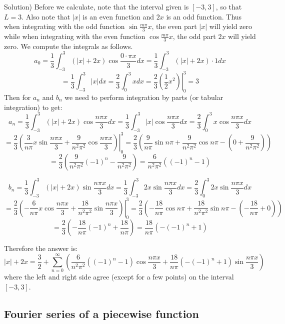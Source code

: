 \documentclass[12pt]{report}
\begin{document}
Solution)
Before we calculate, note that the interval given is $[-3,3]$, so that $L=3$. Also note that $|x|$ is an even function and $2x$ is an odd function. Thus when integrating with the odd function $\sin \frac{m\pi}{3} x$, the even part $|x|$ will yield zero while when integrating with the even function $\cos \frac{m\pi}{3} x$, the odd part $2x$ will yield zero. We compute the integrals as follows.
$$a_0 = \frac{1}{3} \int_{-3}^{3} (|x| +2x) \cos \frac{0\cdot \pi x }{3} dx = \frac{1}{3} \int_{-3}^{3} (|x| +2x) \cdot 1 dx $$
$$= \frac{1}{3} \int_{-3}^{3} |x| dx = \frac{2}{3} \int_{0}^{3} x dx = \frac{2}{3} \left. \left( \frac{1}{2} x^2 \right) \right\vert_0^3 = 3 $$
Then for $a_n$ and $b_n$ we need to perform integration by parts (or tabular integration) to get:
$$a_n = \frac{1}{3} \int_{-3}^{3} (|x| +2x) \cos \frac{n\pi x }{3} dx = \frac{1}{3} \int_{-3}^{3} |x| \cos \frac{n \pi x }{3} dx = \frac{2}{3} \int_{0}^{3} x \cos \frac{n\pi x }{3} dx$$
$$= \frac{2}{3} \left. \left( \frac{3}{n\pi} x \sin \frac{n\pi x }{3} + \frac{9}{n^2\pi^2} \cos \frac{n\pi x }{3} \right) \right\vert_0^3 = \frac{2}{3} \left(  \frac{9}{n\pi} \sin n\pi + \frac{9}{n^2\pi^2} \cos n\pi - \left(0 + \frac{9}{n^2\pi^2} \right) \right) $$
$$ = \frac{2}{3} \left( \frac{9}{n^2\pi^2} (-1)^n - \frac{9}{n^2\pi^2} \right) =\frac{6}{n^2\pi^2} \left((-1)^n-1\right) $$

$$b_n = \frac{1}{3} \int_{-3}^{3} (|x| +2x) \sin \frac{n\pi x }{3} dx = \frac{1}{3} \int_{-3}^{3} 2 x \sin \frac{n \pi x }{3} dx = \frac{2}{3} \int_{0}^{3} 2x \sin \frac{n\pi x }{3} dx$$
$$= \frac{2}{3} \left. \left( - \frac{6}{n\pi} x \cos \frac{n\pi x }{3} + \frac{18}{n^2\pi^2} \sin \frac{n\pi x }{3} \right) \right\vert_0^3 = \frac{2}{3} \left(  -\frac{18}{n\pi} \cos n\pi + \frac{18}{n^2\pi^2} \sin n\pi - \left(-\frac{18}{n\pi} + 0 \right) \right) $$
$$ = \frac{2}{3} \left( -\frac{18}{n\pi} (-1)^n +\frac{18}{n\pi} \right) = \frac{18}{n\pi} \left(-(-1)^n+1\right) $$

Therefore the answer is:
$$|x| +2x = \frac{3}{2} +\sum_{n=0}^{\infty} \left( \frac{6}{n^2\pi^2} \left((-1)^n-1\right)  \cos \frac{n \pi x}{3} + \frac{18}{n\pi} \left(-(-1)^n+1\right) \sin \frac{n\pi x}{3} \right) $$
where the left and right side agree (except for a few points) on the interval $[-3,3]$.

\subsection*{Fourier series of a piecewise function}
\end{document}
